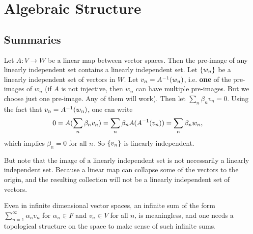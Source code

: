 \chapter{Algebraic Structure}


\section{Summaries}


\begin{summary}
	Let $ A:V\to W $ be a linear map between vector spaces. Then the pre-image of any linearly independent set contains a linearly independent set. Let $ \{w_n\} $ be a linearly independent set of vectors in $ W $. Let $ v_n = A^{-1}(w_n) $, i.e. \textbf{one} of the pre-images of $ w_n $ (if $ A $ is not injective, then $ w_n $ can have multiple pre-images. But we choose just one pre-image. Any of them will work). Then let $ \sum_n \beta_n v_n = 0 $. Using the fact that $ v_n = A^{-1}(w_n) $, one can write
	\[ 0 = A(\sum_n \beta_n v_n) = \sum_n \beta_n A(A^{-1}(v_n)) = \sum_n \beta_n w_n,  \]
	which implies $ \beta_n = 0 $ for all $ n $. So $ \{v_n\} $ is linearly independent.
	
	But note that the image of a linearly independent set is not necessarily a linearly independent set. Because a linear map can collapse some of the vectors to the origin, and the resulting collection will not be a linearly independent set of vectors. 
\end{summary}

\begin{summary}
	Even in infinite dimensional vector spaces, an infinite sum of the form $ \sum_{n=1}^{\infty} \alpha_n v_n $ for $ \alpha_n \in F $ and $ v_n\in V $ for all $ n $, is  meaningless, and one needs a topological structure on the space to make sense of such infinite sums.
\end{summary}


